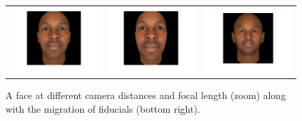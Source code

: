 \documentclass[runningheads]{llncs}
\begin{document}
\begin{figure}[ht]
\begin{tabular}{ccc}
\includegraphics[width=.3\linewidth]{../resources/figures/extracted_fiducial_0005.png} &
\includegraphics[width=.3\linewidth]{../resources/figures/extracted_fiducial_0007.png} &
\includegraphics[width=.3\linewidth]{../resources/figures/fiducial_migration.png}
\end{tabular}
\caption{A face at different camera distances and focal length (zoom) along with the migration of fiducials (bottom right).}
\label{fig:fiducial_migration}
\end{figure}
\end{document}
